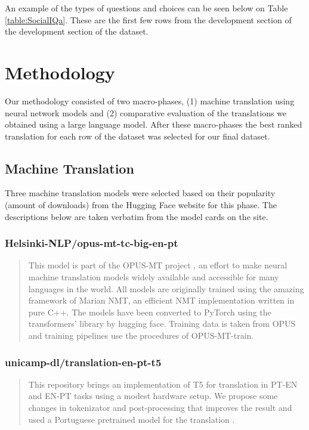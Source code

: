 \documentclass{article}
\begin{document}
An example of the types of questions and choices can be seen below on Table
\ref{table:SocialIQa}. These are the first few rows from the development section
of the development section of the dataset.
 

\section{Methodology} 

Our methodology consisted of two macro-phases, (1) machine translation using
neural network models and (2) comparative evaluation of the translations we
obtained using a large language model. After these macro-phases the best ranked
translation for each row of the dataset was selected for our final dataset.

\subsection{Machine Translation}
\label{subsec:machine-translation}

Three machine translation models were selected based on their popularity (amount
of downloads) from the Hugging Face website for this phase. The descriptions
below are taken verbatim from the model cards on the site.

\subsubsection{Helsinki-NLP/opus-mt-tc-big-en-pt}

\begin{quote}
This model is part of the OPUS-MT project \cite{tiedemann2020opus}, an effort to
make neural machine translation models widely available and accessible for many
languages in the world. All models are originally trained using the amazing
framework of Marian NMT, an efficient NMT implementation written in pure C++.
The models have been converted to PyTorch using the transformers' library by
hugging face. Training data is taken from OPUS and training pipelines use the
procedures of OPUS-MT-train.
\end{quote}

\subsubsection{unicamp-dl/translation-en-pt-t5}

\begin{quote}
This repository brings an implementation of T5 for translation in PT-EN and
EN-PT tasks using a modest hardware setup. We propose some changes in
tokenizator and post-processing that improves the result and used a Portuguese
pretrained model for the translation \cite{lopes2020lite}.
\end{quote}
\end{document}
